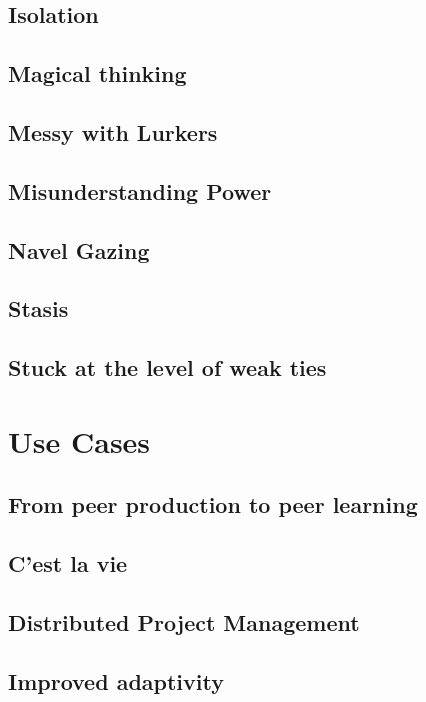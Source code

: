 \documentclass[ebook, 12pt, twoside]{memoir}
\begin{document}
\section*{Isolation}

\section*{Magical thinking}

\section*{Messy with Lurkers}

\section*{Misunderstanding Power}

\section*{Navel Gazing}

\section*{Stasis}

\section*{Stuck at the level of weak ties}


\chapter[\textbf{Use Cases}]{ Use Cases }
\section*{From peer production to peer learning}

\section*{C’est la vie}

\section*{Distributed Project Management}

\section*{Improved adaptivity}

\end{document}
